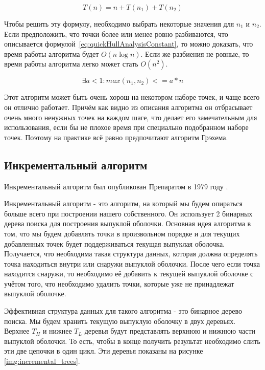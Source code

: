 \begin{equation}\label{eq:quickHullAnalysisBegin}
T(n) = n + T(n_1) + T(n_2)
\end{equation}

Чтобы решить эту формулу, необходимо выбрать некоторые значения для $n_1$ и $n_2$. Если предположить, что точки более или менее ровно разбиваются, что описывается формулой~\ref{eq:quickHullAnalysisConstant}, то можно доказать, что время работы алгоритма будет $O(n \log n)$. Если же разбиения не ровные, то время работы алгоритма легко может стать $O(n^2)$.


\begin{equation}\label{eq:quickHullAnalysisConstant}
\exists  a < 1 : max(n_1, n_2) <= a * n
\end{equation}

Этот алгоритм может быть очень хорош на некотором наборе точек, и чаще всего он отлично работает. Причём как видно из описания алгоритма он отбрасывает очень много ненужных точек на каждом шаге, что делает его замечательным для использования, если бы не плохое время при специально подобранном наборе точек. Поэтому на практике всё равно предпочитают алгоритм Грэхема.

\subsection{Инкрементальный алгоритм} \label{subsect1_1_5}

Инкрементальный алгоритм был опубликован Препаратом в 1979 году \cite{preparata1979Incremental}.


Инкрементальный алгоритм - это алгоритм, на который мы будем опираться больше всего при построении нашего собственного. Он использует 2 бинарных дерева поиска для построения выпуклой оболочки. Основная идея алгоритма в том, что мы будем добавлять точки в произвольном порядке и для текущих добавленных точек будет поддерживаться текущая выпуклая оболочка. Получается, что необходима такая структура данных, которая должна определять точка находиться внутри или снаружи выпуклой оболочки. После чего если точка находится снаружи, то необходимо её добавить к текущей выпуклой оболочке с учётом того, что необходимо удалить точки, которые уже не принадлежат выпуклой оболочке.

Эффективная структура данных для такого алгоритма - это бинарное дерево поиска. Мы будем хранить текущую выпуклую оболочку в двух деревьях. Верхнее $T_H$ и нижнее $T_L$ деревья будут представлять верхнюю и нижнюю части выпуклой оболочки. То есть, чтобы в конце получить результат необходимо слить эти две цепочки в один цикл. Эти деревья показаны на рисунке \ref{img:incremental_trees}.

